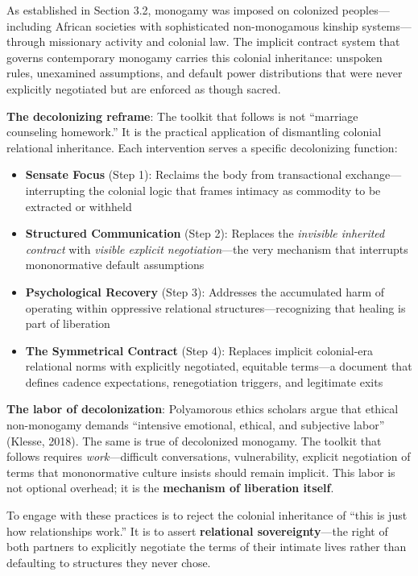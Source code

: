 \documentclass[12pt, letterpaper]{article}
\begin{document}
As established in Section 3.2, monogamy was imposed on colonized peoples---including African societies with sophisticated non-monogamous kinship systems---through missionary activity and colonial law. The implicit contract system that governs contemporary monogamy carries this colonial inheritance: unspoken rules, unexamined assumptions, and default power distributions that were never explicitly negotiated but are enforced as though sacred.

\textbf{The decolonizing reframe}: The toolkit that follows is not ``marriage counseling homework.'' It is the practical application of dismantling colonial relational inheritance. Each intervention serves a specific decolonizing function:

\begin{itemize}
    \item \textbf{Sensate Focus} (Step 1): Reclaims the body from transactional exchange---interrupting the colonial logic that frames intimacy as commodity to be extracted or withheld

    \item \textbf{Structured Communication} (Step 2): Replaces the \textit{invisible inherited contract} with \textit{visible explicit negotiation}---the very mechanism that interrupts mononormative default assumptions

    \item \textbf{Psychological Recovery} (Step 3): Addresses the accumulated harm of operating within oppressive relational structures---recognizing that healing is part of liberation

    \item \textbf{The Symmetrical Contract} (Step 4): Replaces implicit colonial-era relational norms with explicitly negotiated, equitable terms---a document that defines cadence expectations, renegotiation triggers, and legitimate exits
\end{itemize}

\textbf{The labor of decolonization}: Polyamorous ethics scholars argue that ethical non-monogamy demands ``intensive emotional, ethical, and subjective labor'' (Klesse, 2018). The same is true of decolonized monogamy. The toolkit that follows requires \textit{work}---difficult conversations, vulnerability, explicit negotiation of terms that mononormative culture insists should remain implicit. This labor is not optional overhead; it is the \textbf{mechanism of liberation itself}.

To engage with these practices is to reject the colonial inheritance of ``this is just how relationships work.'' It is to assert \textbf{relational sovereignty}---the right of both partners to explicitly negotiate the terms of their intimate lives rather than defaulting to structures they never chose.
\end{document}

